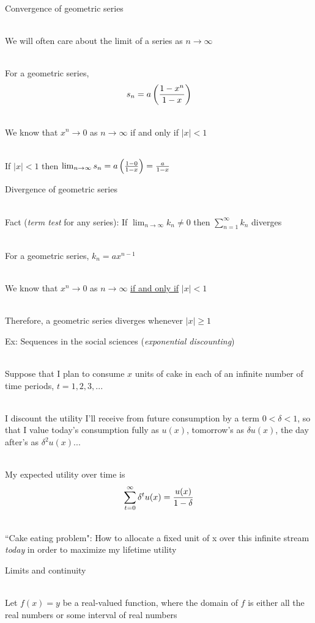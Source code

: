 \documentclass[10pt]{seminar}
\begin{document}
\begin{slide}
\newslide
Convergence of geometric series

\ \\We will often care about the limit of a series as $n\rightarrow \infty$

\ \\For a geometric series, $$s_n=a\left({{1-x^n}\over{1-x}}\right)$$

\ \\We know that $x^n\rightarrow 0$ as $n\rightarrow\infty$ if and only if $|x|<1$

\ \\If $|x|<1$ then $\lim_{n\rightarrow\infty}s_n=a\left({{1-0}\over{1-x}}\right) = {a\over{1-x}}$

\newslide
Divergence of geometric series

\ \\Fact (\textit{term test} for any series): If $\lim_{n\rightarrow \infty} k_n\not=0$ then $\sum_{n=1}^\infty k_n$ diverges

\ \\For a geometric series, $k_n=ax^{n-1}$

\ \\We know that $x^n\rightarrow 0$ as $n\rightarrow\infty$ \underline{if and only if} $|x|<1$

\ \\Therefore, a geometric series diverges whenever $|x|\geq 1$
\newslide

Ex: Sequences in the social sciences (\textit{exponential discounting})

\ \\Suppose that I plan to consume $x$ units of cake in each of an infinite number of time periods, $t=1, 2, 3, ...$

\ \\I discount the utility I'll receive from future consumption by a term $0<\delta<1$, so that I value today's consumption fully as $u(x)$, tomorrow's as  $\delta u(x)$, the day after's as $\delta^2 u(x)$...

\ \\My expected utility over time is $$\sum_{t=0}^\infty \delta^t u(x) = {{u(x)}\over{1-\delta}}$$

\ \\``Cake eating problem": How to allocate a fixed unit of x over this infinite stream \textit{today} in order to maximize my lifetime utility

\newslide
Limits and continuity

\ \\Let $f(x)=y$ be a real-valued function, where the domain of $f$ is either all the real numbers or some interval of real numbers 


\end{slide}
\end{document}
